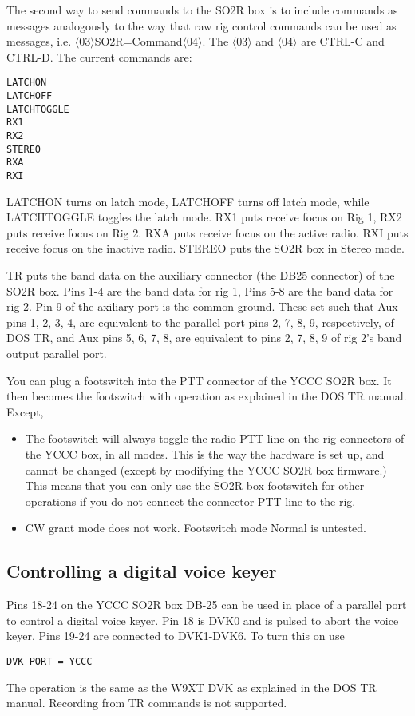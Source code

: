 \documentclass[12pt]{article}
\begin{document}
The second way to send commands to the SO2R box is to
include commands as messages analogously to the way that
raw rig control commands can be used as messages, i.e.
$\langle$03$\rangle$SO2R=Command$\langle$04$\rangle$.
The $\langle$03$\rangle$ and $\langle$04$\rangle$  are CTRL-C and CTRL-D.
The current commands are:
\begin{verbatim}
LATCHON
LATCHOFF
LATCHTOGGLE
RX1
RX2
STEREO
RXA
RXI
\end{verbatim}
LATCHON
turns on latch mode, LATCHOFF turns off latch mode, while LATCHTOGGLE
toggles the latch mode.
RX1
puts receive focus on Rig 1, RX2 puts receive focus on Rig 2.
RXA puts receive focus on the active radio.
RXI puts receive focus on the inactive radio.
STEREO puts the SO2R box in Stereo mode. 

TR puts the band data
on the auxiliary connector (the DB25 connector)
of the SO2R box. Pins 1-4 are the band data for rig 1, Pins 5-8 are
the band data for rig 2. Pin 9 of the axiliary port is the common ground.
These set such that Aux pins 1, 2, 3, 4,
are equivalent to the parallel port pins 2, 7, 8, 9, respectively, of DOS TR,
and Aux pins 5, 6, 7, 8, are equivalent to pins 2, 7, 8, 9 of rig 2's
band output parallel port.

You can plug a footswitch
into the PTT connector of the YCCC SO2R box.
It then becomes the footswitch with operation as explained in the DOS TR
manual. Except,
\begin{itemize}
\item
The footswitch will always toggle the radio PTT line
on the rig connectors of the YCCC box, in all modes. This is the way the
hardware is set up, and cannot be changed (except by modifying the
YCCC SO2R box firmware.) This means that you can only use the
SO2R box footswitch for other operations if you do not connect the
connector PTT line to the rig.
\item
CW grant mode does not work. Footswitch mode Normal is untested.
\end{itemize}

\subsection{Controlling a digital voice keyer}
Pins 18-24 on the YCCC SO2R box DB-25 can be used in place of a
parallel port to control a digital voice keyer. Pin 18 is DVK0 and is
pulsed to abort the voice keyer. Pins 19-24 are connected to DVK1-DVK6.
To turn this on use
\begin{verbatim}
DVK PORT = YCCC
\end{verbatim}
The operation is the same as the W9XT DVK as explained in the DOS TR
manual. Recording from TR commands is not supported.
\end{document}
